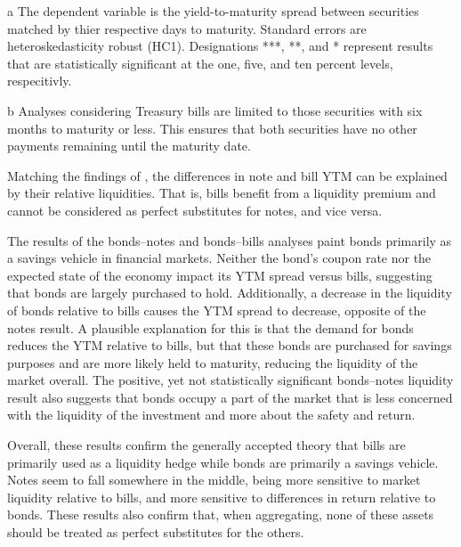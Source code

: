 \documentclass[11pt,a4paper,margin=1.5in]{article}
\begin{document}
\begin{table}[p]
\begin{threeparttable}
\begin{tabular}{l d{2.4} d{2.4} d{2.4}}
		\end{tabular}
		\begin{tablenotes}
			\item[a] \footnotesize{The dependent variable is the yield-to-maturity spread between securities matched by thier respective days to maturity. Standard errors are heteroskedasticity robust (HC1). Designations ***, **, and * represent results that are statistically significant at the one, five, and ten percent levels, respecitivly.}
			\item[b] \footnotesize{Analyses considering Treasury bills are limited to those securities with six months to maturity or less. This ensures that both securities have no other payments remaining until the maturity date.}
		\end{tablenotes}
	\end{threeparttable}
\end{table}

Matching the findings of \citet{Amihud-Mendelson:1991}, the differences in note and bill YTM can be explained by their relative liquidities.
That is, bills benefit from a liquidity premium and cannot be considered as perfect substitutes for notes, and vice versa.

The results of the bonds--notes and bonds--bills analyses paint bonds primarily as a savings vehicle in financial markets. 
Neither the bond's coupon rate nor the expected state of the economy impact its YTM spread versus bills, suggesting that bonds are largely purchased to hold.
Additionally, a decrease in the liquidity of bonds relative to bills causes the YTM spread to decrease, opposite of the notes result. 
A plausible explanation for this is that the demand for bonds reduces the YTM relative to bills, but that these bonds are purchased for savings purposes and are more likely held to maturity, reducing the liquidity of the market overall.
The positive, yet not statistically significant bonds--notes liquidity result also suggests that bonds occupy a part of the market that is less concerned with the liquidity of the investment and more about the safety and return.


Overall, these results confirm the generally accepted theory that bills are primarily used as a liquidity hedge while bonds are primarily a savings vehicle.
Notes seem to fall somewhere in the middle, being more sensitive to market liquidity relative to bills, and more sensitive to differences in return relative to bonds.
These results also confirm that, when aggregating, none of these assets should be treated as perfect substitutes for the others.
\end{document}
